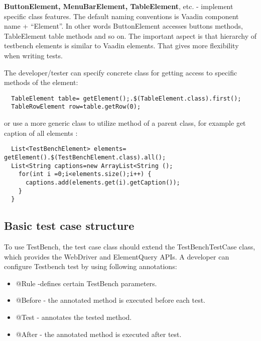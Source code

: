 \textbf{ButtonElement, MenuBarElement, TableElement}, etc. - implement specific
class features. The default naming conventions is Vaadin component name + ``Element''.
In other words ButtonElement accesses buttons methods, TableElement table methods and so on.
The important aspect is that hierarchy of testbench elements is similar to Vaadin elements.
That gives more flexibility when writing tests.

The  developer/tester can specify concrete class for getting access to specific methods of the element:
 
 \lstset{language=Java}
  \begin{lstlisting}
  TableElement table= getElement();.$(TableElement.class).first();
  TableRowElement row=table.getRow(0);
 \end{lstlisting}
 
or use a more generic class to utilize method of a parent class, for example get caption of all elements :

  \lstset{language=Java}
  \begin{lstlisting}
  List<TestBenchElement> elements= getElement().$(TestBenchElement.class).all();
  List<String captions=new ArrayList<String ();
    for(int i =0;i<elements.size();i++) {
      captions.add(elements.get(i).getCaption());
    }
  }
  \end{lstlisting}

\subsection {Basic test case structure}
To use TestBench, the test case class should extend the TestBenchTestCase class,
which provides the WebDriver and ElementQuery APIs. A developer
can configure Testbench test by using following annotations:
\begin{itemize}
  \item @Rule -defines certain TestBench parameters.
  \item @Before - the annotated method is executed before each test.
  \item @Test - annotates the tested method.
  \item @After - the annotated method is executed after test.
\end{itemize}

